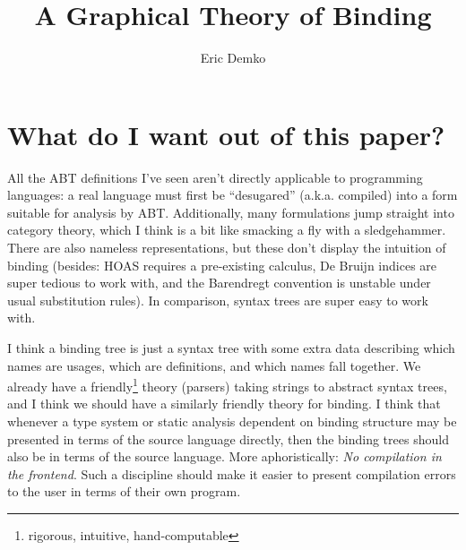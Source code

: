 \documentclass[11pt]{article} %
\title{A Graphical Theory of Binding}
\author{Eric Demko}
\theoremstyle{definition}
\begin{document}
\maketitle

\section*{What do I want out of this paper?}

All the ABT definitions I've seen aren't directly applicable to programming languages: a real language must first be ``desugared'' (a.k.a. compiled) into a form suitable for analysis by ABT.
Additionally, many formulations jump straight into category theory, which I think is a bit like smacking a fly with a sledgehammer.
There are also nameless representations, but these don't display the intuition of binding (besides: HOAS requires a pre-existing calculus, De Bruijn indices are super tedious to work with, and the Barendregt convention is unstable under usual substitution rules).
In comparison, syntax trees are super easy to work with.

I think a binding tree is just a syntax tree with some extra data describing which names are usages, which are definitions, and which names fall together.
We already have a friendly\footnote{rigorous, intuitive, hand-computable} theory (parsers) taking strings to abstract syntax trees, and I think we should have a similarly friendly theory for binding.
I think that whenever a type system or static analysis dependent on binding structure may be presented in terms of the source language directly, then the binding trees should also be in terms of the source language. More aphoristically: \emph{No compilation in the frontend}.
Such a discipline should make it easier to present compilation errors to the user in terms of their own program.
\end{document}
